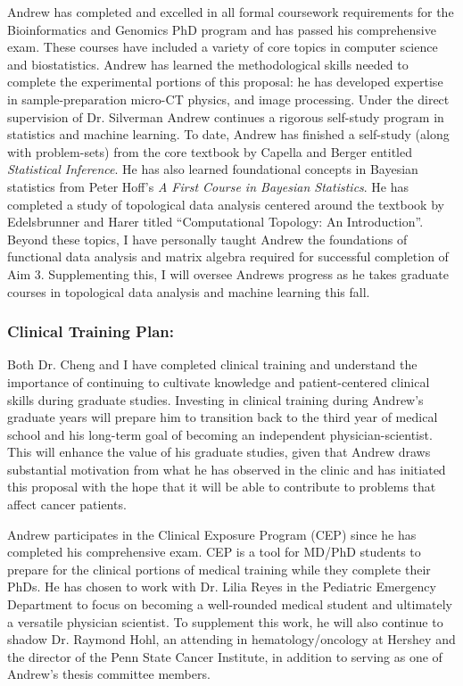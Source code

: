 \documentclass{NIHGrant}
\begin{document}
Andrew has completed and excelled in all formal coursework requirements for the Bioinformatics and Genomics PhD program and has passed his comprehensive exam. These courses have included a variety of core topics in computer science and biostatistics. Andrew has learned the methodological skills needed to complete the experimental portions of this proposal: he has developed expertise in sample-preparation micro-CT physics, and image processing. Under the direct supervision of Dr. Silverman Andrew continues a rigorous self-study program in statistics and machine learning. To date, Andrew has finished a self-study (along with problem-sets) from the core textbook by Capella and Berger entitled \textit{Statistical Inference}. He has also learned foundational concepts in Bayesian statistics from Peter Hoff's \textit{A First Course in Bayesian Statistics}. He has completed a study of topological data analysis centered around the textbook by Edelsbrunner and Harer titled ``Computational Topology: An Introduction''. Beyond these topics, I have personally taught Andrew the foundations of functional data analysis and matrix algebra required for successful completion of Aim 3. Supplementing this, I will oversee Andrews progress as he takes graduate courses in topological data analysis and machine learning this fall. 

\subsubsection*{Clinical Training Plan: }
Both Dr. Cheng and I have completed clinical training and understand the importance of continuing to cultivate knowledge and patient-centered clinical skills during graduate studies. Investing in clinical training during Andrew's graduate years will prepare him to transition back to the third year of medical school and his long-term goal of becoming an independent physician-scientist. This will enhance the value of his graduate studies, given that Andrew draws substantial motivation from what he has observed in the clinic and has initiated this proposal with the hope that it will be able to contribute to problems that affect cancer patients.

Andrew participates in the Clinical Exposure Program (CEP) since he has completed his comprehensive exam. CEP is a tool for MD/PhD students to prepare for the clinical portions of medical training while they complete their PhDs. He has chosen to work with Dr. Lilia Reyes in the Pediatric Emergency Department to focus on becoming a well-rounded medical student and ultimately a versatile physician scientist. To supplement this work, he will also continue to shadow Dr. Raymond Hohl, an attending in hematology/oncology at Hershey and the director of the Penn State Cancer Institute, in addition to serving as one of Andrew's thesis committee members.
\end{document}
